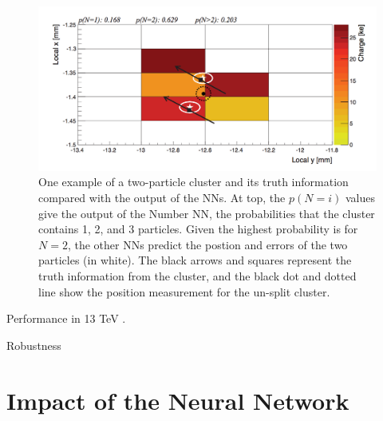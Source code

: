 \begin{centering}
\begin{figure}[bth]
\myfloatalign
\includegraphics[width=.90\linewidth]{figures/nn/merged_cluster.png}
\caption{One example of a two-particle cluster and its truth information compared with the output of the \acp{NN}. At top, the $p(N=i)$ values give the output of the Number \ac{NN}, the probabilities that the cluster contains 1, 2, and 3 particles. Given the highest probability is for $N=2$, the other \acp{NN} predict the postion and errors of the two particles (in white). The black arrows and squares represent the truth information from the cluster, and the black dot and dotted line show the position measurement for the un-split cluster.}
\label{fig:merged_cluster}
\end{figure}
\end{centering}


Performance in 13 TeV \cite{ATL-PHYS-PUB-2015-044}. 

Robustness \cite{ATL-PHYS-PUB-2015-052}

\section{Impact of the Neural Network}